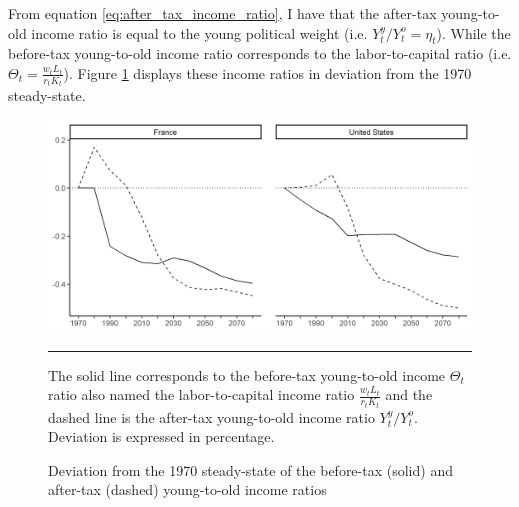 From equation \eqref{eq:after_tax_income_ratio}, I have that the after-tax young-to-old income ratio is equal to the young political weight (i.e. $Y_t^y/Y_t^o = \eta_t$). While the before-tax young-to-old income ratio corresponds to the labor-to-capital ratio (i.e. $\Theta_t = \frac{w_tL_t}{r_tK_t}$). Figure \ref{fig:raw_vs_net_inc_ratio} displays these income ratios in deviation from the 1970 steady-state.
\begin{figure}[tb]
	\centering
	\includegraphics[width=1\linewidth]{../result/redistribution/dev_incratio_raw_vs_net.png}
	\caption{Deviation from the 1970 steady-state of the before-tax (solid) and after-tax (dashed) young-to-old income ratios}
	\label{fig:raw_vs_net_inc_ratio}
	\vspace{.5ex}
	\hrule
	\vspace{-4ex}
	\justify\singlespacing\footnotesize The solid line corresponds to the before-tax young-to-old income $\Theta_t$ ratio also named the labor-to-capital income ratio $\frac{w_tL_t}{r_tK_t}$ and the dashed line is the after-tax young-to-old income ratio $Y_t^y/Y_t^o$. Deviation is expressed in percentage.
\end{figure}
